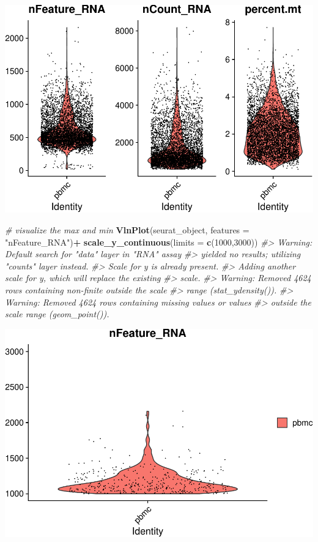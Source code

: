 \documentclass[
]{book}
\newenvironment{Shaded}{\begin{snugshade}}{\end{snugshade}}
\newcommand{\AttributeTok}[1]{\textcolor[rgb]{0.13,0.29,0.53}{#1}}
\newcommand{\CommentTok}[1]{\textcolor[rgb]{0.56,0.35,0.01}{\textit{#1}}}
\newcommand{\DecValTok}[1]{\textcolor[rgb]{0.00,0.00,0.81}{#1}}
\newcommand{\FunctionTok}[1]{\textcolor[rgb]{0.13,0.29,0.53}{\textbf{#1}}}
\newcommand{\NormalTok}[1]{#1}
\newcommand{\SpecialCharTok}[1]{\textcolor[rgb]{0.81,0.36,0.00}{\textbf{#1}}}
\newcommand{\StringTok}[1]{\textcolor[rgb]{0.31,0.60,0.02}{#1}}
\begin{document}
\includegraphics{scRNAseqInR_ABACBS_2024_Doco_files/figure-latex/qc2-1.pdf}

\begin{Shaded}
\begin{Highlighting}[]


\CommentTok{\# visualize the max and min }
\FunctionTok{VlnPlot}\NormalTok{(seurat\_object, }\AttributeTok{features =} \StringTok{"nFeature\_RNA"}\NormalTok{)}\SpecialCharTok{+} \FunctionTok{scale\_y\_continuous}\NormalTok{(}\AttributeTok{limits =} \FunctionTok{c}\NormalTok{(}\DecValTok{1000}\NormalTok{,}\DecValTok{3000}\NormalTok{))}
\CommentTok{\#\textgreater{} Warning: Default search for "data" layer in "RNA" assay}
\CommentTok{\#\textgreater{} yielded no results; utilizing "counts" layer instead.}
\CommentTok{\#\textgreater{} Scale for y is already present.}
\CommentTok{\#\textgreater{} Adding another scale for y, which will replace the existing}
\CommentTok{\#\textgreater{} scale.}
\CommentTok{\#\textgreater{} Warning: Removed 4624 rows containing non{-}finite outside the scale}
\CommentTok{\#\textgreater{} range (\textasciigrave{}stat\_ydensity()\textasciigrave{}).}
\CommentTok{\#\textgreater{} Warning: Removed 4624 rows containing missing values or values}
\CommentTok{\#\textgreater{} outside the scale range (\textasciigrave{}geom\_point()\textasciigrave{}).}
\end{Highlighting}
\end{Shaded}

\includegraphics{scRNAseqInR_ABACBS_2024_Doco_files/figure-latex/qc2-2.pdf}
\end{document}
